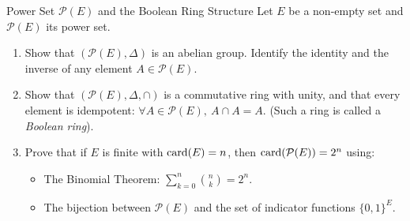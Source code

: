 \begin{exercise}{Power Set $\mathcal{P}(E)$ and the Boolean Ring Structure}
Let $E$ be a non-empty set and $\mathcal{P}(E)$ its power set.
\begin{enumerate}[leftmargin=1.5em,itemsep=2pt]
  \item Show that $(\mathcal{P}(E), \Delta)$ is an abelian group. Identify the identity and the inverse of any element $A \in \mathcal{P}(E)$.
  \item Show that $(\mathcal{P}(E), \Delta, \cap)$ is a commutative ring with unity, and that every element is idempotent: $\forall A \in \mathcal{P}(E),\ A \cap A = A$. (Such a ring is called a \emph{Boolean ring}).
  \item Prove that if $E$ is finite with $\operatorname{card}(E) = n$, then $\operatorname{card}(\mathcal{P}(E)) = 2^n$ using:
  \begin{itemize}[leftmargin=1.2em,itemsep=1pt]
    \item[(a)] The Binomial Theorem: $\sum_{k=0}^n \binom{n}{k} = 2^n$.
    \item[(b)] The bijection between $\mathcal{P}(E)$ and the set of indicator functions $\{0, 1\}^E$.
  \end{itemize}
\end{enumerate}
\end{exercise}

\begin{tabletworkspace}[5.5cm]
\end{tabletworkspace}

